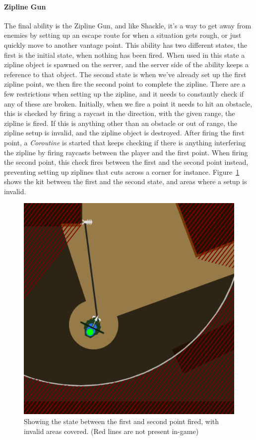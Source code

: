 \paragraph{Zipline Gun}
The final ability is the Zipline Gun, and like Shackle, it's a way to get away from enemies by setting up an escape route for when a situation gets rough, or just quickly move to another vantage point. This ability has two different states, the first is the initial state, when nothing has been fired. When used in this state a zipline object is spawned on the server, and the server side of the ability keeps a reference to that object. The second state is when we've already set up the first zipline point, we then fire the second point to complete the zipline. There are a few restrictions when setting up the zipline, and it needs to constantly check if any of these are broken. Initially, when we fire a point it needs to hit an obstacle, this is checked by firing a raycast in the direction, with the given range, the zipline is fired. If this is anything other than an obstacle or out of range, the zipline setup is invalid, and the zipline object is destroyed. After firing the first point, a \emph{Coroutine} is started that keeps checking if there is anything interfering the zipline by firing raycasts between the player and the first point. When firing the second point, this check fires between the first and the second point instead, preventing setting up ziplines that cuts across a corner for instance. Figure~\ref{fig:ziplineMidSetup} shows the kit between the first and the second state, and areas where a setup is invalid.

\begin{figure}[htbp]  %
  \centering
  \includegraphics[width=.6\textwidth]{images/ZiplineMidSetup}
  \caption[Zipline mid-setup]{Showing the state between the first and second point fired, with invalid areas covered. (Red lines are not present in-game)}
  \label{fig:ziplineMidSetup}
\end{figure}

